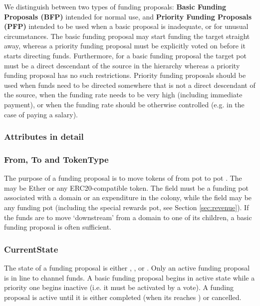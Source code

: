 We distinguish between two types of funding proposals: \textbf{Basic Funding Proposals (BFP)} intended for normal use, and \textbf{Priority Funding Proposals (PFP)} intended to be used when a basic proposal is inadequate, or for unusual circumstances. The basic funding proposal may start funding the target straight away, whereas a priority funding proposal must be explicitly voted on before it starts directing funds. Furthermore, for a basic funding proposal the target pot must be a direct descendant of the source in the hierarchy whereas a priority funding proposal has no such restrictions. Priority funding proposals should be used when funds need to be directed somewhere that is not a direct descendant of the source, when the funding rate needs to be very high (including immediate payment), or when the funding rate should be otherwise controlled (e.g. in the case of paying a salary).

\subsubsection{Attributes in detail}

\subsubsection*{From, To and TokenType}
The purpose of a funding proposal is to move tokens of  from pot  to pot . The  may be Ether or any ERC20-compatible token. The  field must be a funding pot associated with a domain or an expenditure in the colony, while the  field may be any funding pot (including the special rewards pot, see Section \ref{sec:revenue}). If the funds are to move `downstream' from a domain to one of its children, a basic funding proposal is often sufficient.

\subsubsection*{CurrentState}
The state of a funding proposal is either , ,  or . Only an active funding proposal is in line to channel funds. A basic funding proposal begins in active state while a priority one begins inactive (i.e. it must be activated by a vote). A funding proposal is active until it is either completed (when its  reaches ) or cancelled.

